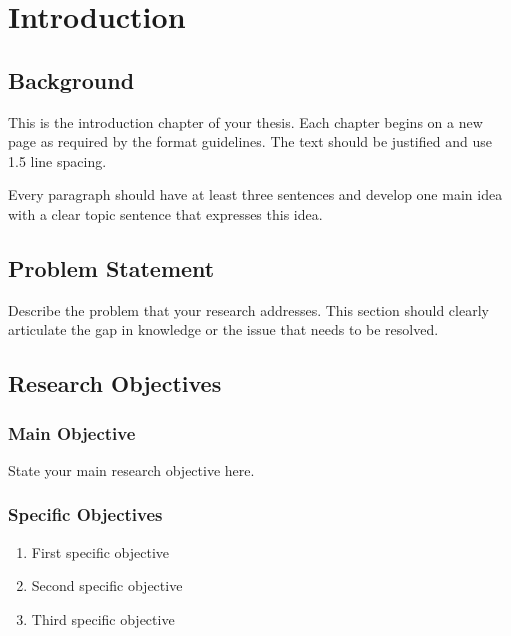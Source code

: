 
\chapter{Introduction}

\section{Background}

This is the introduction chapter of your thesis. Each chapter begins on a new page as required by the format guidelines. The text should be justified and use 1.5 line spacing.

Every paragraph should have at least three sentences and develop one main idea with a clear topic sentence that expresses this idea.

\section{Problem Statement}

Describe the problem that your research addresses. This section should clearly articulate the gap in knowledge or the issue that needs to be resolved.

\section{Research Objectives}

\subsection{Main Objective}

State your main research objective here.

\subsection{Specific Objectives}

\begin{enumerate}
    \item First specific objective
    \item Second specific objective  
    \item Third specific objective
\end{enumerate}

